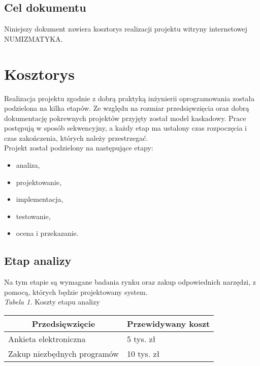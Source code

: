 \documentclass 	[11pt, a4paper, leqno]	{article}					%
\begin{document}
\subsection{Cel dokumentu}
\noindent
Niniejszy dokument zawiera kosztorys realizacji projektu witryny internetowej NUMIZMATYKA. \\

\section{Kosztorys}
\noindent
Realizacja projektu zgodnie z dobrą praktyką inżynierii oprogramowania została podzielona na kilka etapów. Ze względu na rozmiar przedsięwzięcia oraz dobrą dokumentację pokrewnych projektów przyjęty został model kaskadowy. Prace postępują w sposób sekwencyjny, a każdy etap ma ustalony czas rozpoczęcia i czas zakończenia, których należy przestrzegać. \\

Projekt został podzielony na następujące etapy:
\begin{itemize}
\item analiza,
\item projektowanie,
\item implementacja,
\item testowanie,
\item ocena i przekazanie.
\end{itemize}


\subsection{Etap analizy}
\noindent
Na tym etapie są wymagane badania rynku oraz zakup odpowiednich narzędzi, z pomocą, których będzie projektowany system. \\ 

\textit{Tabela 1.} Koszty etapu analizy
\begin{center}
	\begin{tabular}{| l | l |}
		\hline
		\multicolumn{1}{|c|}{Przedsięwzięcie} & 
		\multicolumn{1}{|c|}{Przewidywany koszt} \\ \hline \hline
		Ankieta elektroniczna & 5 tys. zł \\ \hline
		Zakup niezbędnych programów & 10 tys. zł \\ \hline
	\end{tabular}
\end{center}
\end{document}
